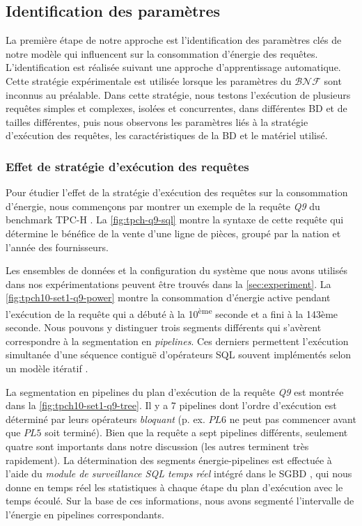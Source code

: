 \subsection{Identification des paramètres}
La première étape de notre approche est l'identification des paramètres clés de notre modèle qui influencent sur la consommation d'énergie des requêtes. L'identification est réalisée suivant une approche d'apprentissage automatique. Cette stratégie expérimentale est utilisée lorsque les paramètres du $\mathcal{BNF}$ sont inconnus au préalable. Dans cette stratégie, nous testons l'exécution de plusieurs requêtes simples et complexes, isolées et concurrentes, dans différentes BD et de tailles différentes, puis nous observons les paramètres liés à la stratégie d'exécution des requêtes, les caractéristiques de la BD et le matériel utilisé.

\subsubsection{Effet de stratégie d'exécution des requêtes}
Pour étudier l'effet de la stratégie d'exécution des requêtes sur la consommation d'énergie, nous commençons par montrer un exemple de la requête \textit{Q9} du benchmark TPC-H \cite{TPCH}. La \ref{fig:tpch-q9-sql} montre la syntaxe de cette requête qui détermine le bénéfice de la vente d'une ligne de pièces, groupé par la nation et l'année des fournisseurs.

Les ensembles de données et la configuration du système que nous avons utilisés dans nos expérimentations peuvent être trouvés dans la \ref{sec:experiment}.
La \ref{fig:tpch10-set1-q9-power} montre la consommation d'énergie active pendant l'exécution de la requête qui a débuté à la 10\textsuperscript{ème} seconde et a fini à la 143{ème} seconde. Nous pouvons y distinguer trois segments différents qui s'avèrent correspondre à la segmentation en \textit{pipelines}. Ces derniers permettent l'exécution simultanée d'une séquence contiguë d'opérateurs SQL souvent implémentés selon un modèle itératif \cite{Connolly05}.

La segmentation en pipelines du plan d'exécution de la requête \textit{Q9} est montrée dans la \ref{fig:tpch10-set1-q9-tree}. Il y a 7 pipelines dont l'ordre d'exécution est déterminé par leurs opérateurs \textit{bloquant} (p. ex. $PL6$ ne peut pas commencer avant que $PL5$ soit terminé). Bien que la requête a sept pipelines différents, seulement quatre sont importants dans notre discussion (les autres terminent très rapidement).
La détermination des segments énergie-pipelines est effectuée à l'aide du \textit{module de surveillance SQL temps réel} intégré dans le SGBD \cite{Sergey09}, qui nous donne en temps réel les statistiques à chaque étape du plan d'exécution avec le temps écoulé. Sur la base de ces informations, nous avons segmenté l'intervalle de l'énergie en pipelines correspondants.

